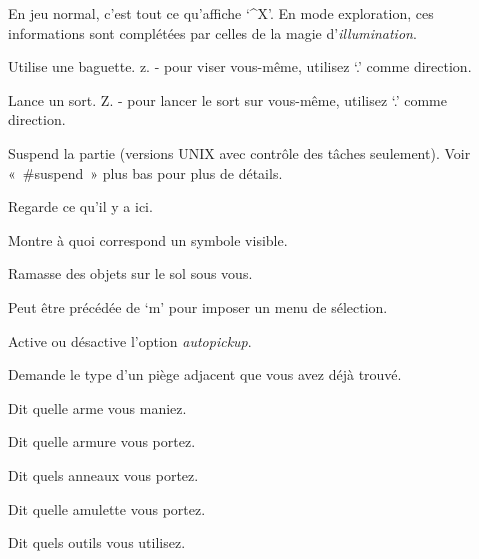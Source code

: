 \documentclass[titlepage]{article}
\begin{document}
\begin{description}
En jeu normal, c'est tout ce qu'affiche `\textasciicircum{}X'.
En mode exploration, ces informations sont complétées par celles de la
magie d'\textit{illumination}.

\item[{z}]
Utilise une baguette.
z. - pour viser vous-même, utilisez `.' comme direction.\\

\item[{Z}]
Lance un sort.
Z. - pour lancer le sort sur vous-même, utilisez `.' comme\\
direction.\\

\item[{\textasciicircum{}Z}]
Suspend la partie
(versions UNIX avec contrôle des tâches seulement).
Voir «~\#suspend~» plus bas pour plus de détails.

\item[{:}]
Regarde ce qu'il y a ici.

\item[{;}]
Montre à quoi correspond un symbole visible.

\item[{,}]
Ramasse des objets sur le sol sous vous.


Peut être précédée de `m' pour imposer un menu de sélection.

\item[{@}]
Active ou désactive l'option
\textit{autopickup}.

\item[{\textasciicircum{}}]
Demande le type d'un piège adjacent que vous avez déjà trouvé.

\item[{)}]
Dit quelle arme vous maniez.

\item[{[}]
Dit quelle armure vous portez.

\item[{=}]
Dit quels anneaux vous portez.

\item[{\textquotedbl{}}]
Dit quelle amulette vous portez.

\item[{(}]
Dit quels outils vous utilisez.


\end{description}
\end{document}
